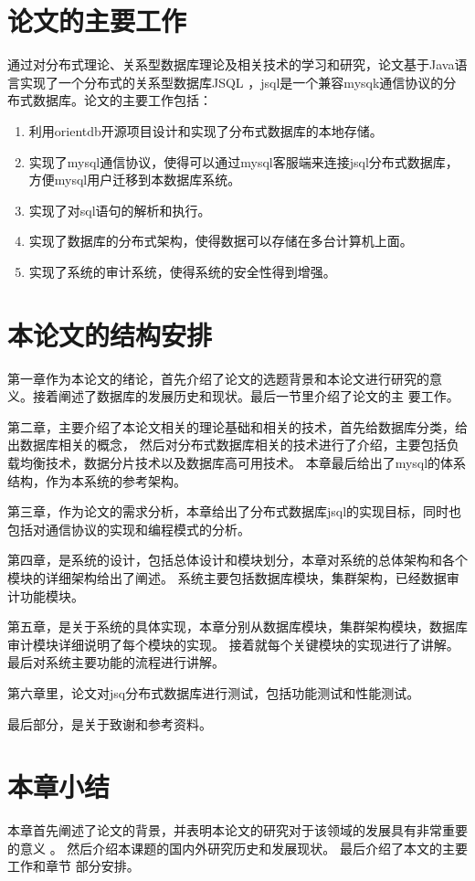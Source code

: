 \section{论文的主要工作}
通过对分布式理论、关系型数据库理论及相关技术的学习和研究，论文基于Java语言实现了一个分布式的关系型数据库JSQL
，jsql是一个兼容mysqk通信协议的分布式数据库。论文的主要工作包括：
\begin{enumerate}
	\item 利用orientdb开源项目设计和实现了分布式数据库的本地存储。
	
	\item 实现了mysql通信协议，使得可以通过mysql客服端来连接jsql分布式数据库，
	方便mysql用户迁移到本数据库系统。
	\item 实现了对sql语句的解析和执行。
	
	\item 实现了数据库的分布式架构，使得数据可以存储在多台计算机上面。
	
	\item 实现了系统的审计系统，使得系统的安全性得到增强。
\end{enumerate}
\section{本论文的结构安排}
第一章作为本论文的绪论，首先介绍了论文的选题背景和本论文进行研究的意
义。接着阐述了数据库的发展历史和现状。最后一节里介绍了论文的主
要工作。

第二章，主要介绍了本论文相关的理论基础和相关的技术，首先给数据库分类，给出数据库相关的概念，
然后对分布式数据库相关的技术进行了介绍，主要包括负载均衡技术，数据分片技术以及数据库高可用技术。
本章最后给出了mysql的体系结构，作为本系统的参考架构。

第三章，作为论文的需求分析，本章给出了分布式数据库jsql的实现目标，同时也
包括对通信协议的实现和编程模式的分析。

第四章，是系统的设计，包括总体设计和模块划分，本章对系统的总体架构和各个模块的详细架构给出了阐述。
系统主要包括数据库模块，集群架构，已经数据审计功能模块。

第五章，是关于系统的具体实现，本章分别从数据库模块，集群架构模块，数据库审计模块详细说明了每个模块的实现。
接着就每个关键模块的实现进行了讲解。最后对系统主要功能的流程进行讲解。

第六章里，论文对jsq分布式数据库进行测试，包括功能测试和性能测试。

最后部分，是关于致谢和参考资料。
\section{本章小结}
本章首先阐述了论文的背景，并表明本论文的研究对于该领域的发展具有非常重要的意义
。 然后介绍本课题的国内外研究历史和发展现状。 最后介绍了本文的主要工作和章节
部分安排。